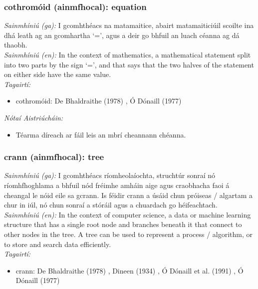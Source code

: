 \subsubsection*{cothromóid (ainmfhocal): equation}
 \noindent \textit{Sainmhíniú (ga):} I gcomhthéacs na matamaitice, abairt matamaiticiúil scoilte ina dhá leath ag an gcomhartha `=', agus a deir go bhfuil an luach céanna ag dá thaobh.
\\
 \noindent \textit{Sainmhíniú (en):} In the context of mathematics, a mathematical statement split into two parts by the sign `=', and that says that the two halves of the statement on either side have the same value.
\\
 \noindent \textit{Tagairtí:}
\begin{itemize}
	\item cothromóid: De Bhaldraithe (1978) \cite{de-bhaldraithe}, Ó Dónaill (1977) \cite{odonaill}
\end{itemize}

 \noindent \textit{Nótaí Aistriúcháin:}
\begin{itemize}
	\item Téarma díreach ar fáil leis an mbrí cheannann chéanna.
\end{itemize}


\subsubsection*{crann (ainmfhocal): tree}
 \noindent \textit{Sainmhíniú (ga):} I gcomhthéacs ríomheolaíochta, struchtúr sonraí nó ríomhfhoghlama a bhfuil nód fréimhe amháin aige agus craobhacha faoi á cheangal le nóid eile sa gcrann. Is féidir crann a úsáid chun próiseas / algartam a chur in iúl, nó chun sonraí a stóráil agus a chuardach go héifeachtach.
\\
 \noindent \textit{Sainmhíniú (en):} In the context of computer science, a data or machine learning structure that has a single root node and branches beneath it that connect to other nodes in the tree. A tree can be used to represent a process / algorithm, or to store and search data efficiently.
\\
 \noindent \textit{Tagairtí:}
\begin{itemize}
	\item crann: De Bhaldraithe (1978) \cite{de-bhaldraithe}, Dineen (1934) \cite{dineen}, Ó Dónaill et al. (1991) \cite{focloir-beag}, Ó Dónaill (1977) \cite{odonaill}
\end{itemize}

